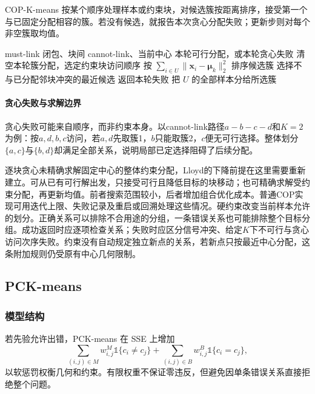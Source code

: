 COP-K-means 按某个顺序处理样本或约束块，对候选簇按距离排序，接受第一个与已固定分配相容的簇。若没有候选，就报告本次贪心分配失败；更新步则对每个非空簇取均值。

\begin{algorithm}
 \label{alg:clustering-cop}
 \begin{algorithmic}[1]
 \Require must-link 闭包、块间 cannot-link、当前中心
 \Ensure 本轮可行分配，或本轮贪心失败
 \State 清空本轮簇分配，选定约束块访问顺序
  \State 按 $\sum_{i\in U}\lVert\bm{x}_i-\bm{\mu}_k\rVert_2^2$ 排序候选簇
  \State 选择不与已分配邻块冲突的最近候选
   \State 返回本轮失败
  \EndIf
  \State 把 $U$ 的全部样本分给所选簇
 \EndFor
 \end{algorithmic}
\end{algorithm}

\paragraph{贪心失败与求解边界}

贪心失败可能来自顺序，而非约束本身。以cannot-link路径$a-b-c-d$和$K=2$为例：按$a,d,b,c$访问，若$a,d$先取簇1，$b$只能取簇2，$c$便无可行选择。整体划分$\{a,c\}$与$\{b,d\}$却满足全部关系，说明局部已定选择阻碍了后续分配。

逐块贪心未精确求解固定中心的整体约束分配，Lloyd的下降前提在这里需要重新建立。可从已有可行解出发，只接受可行且降低目标的块移动；也可精确求解受约束分配，再更新均值。前者搜索范围较小，后者增加组合优化成本。普通COP实现可用迭代上限、失败记录及重启或回溯处理这些情况。硬约束改变当前样本允许的划分。正确关系可以排除不合用途的分组，一条错误关系也可能排除整个目标分组。成功返回时应逐项检查关系；失败时应区分信号冲突、给定$K$下不可行与贪心访问次序失败。约束没有自动规定独立新点的关系，若新点只按最近中心分配，这条附加规则仍受原有中心几何限制。
\subsection{PCK-means}

\subsubsection{模型结构}

若先验允许出错，PCK-means 在 SSE 上增加
\[
 \sum_{(i,j)\in M}w_{i,j}^{M}\mathbb{1}\{c_i\ne c_j\}
 +\sum_{(i,j)\in B}w_{i,j}^{B}\mathbb{1}\{c_i=c_j\},
\]
以软惩罚权衡几何和约束。有限权重不保证零违反，但避免因单条错误关系直接拒绝整个问题。

